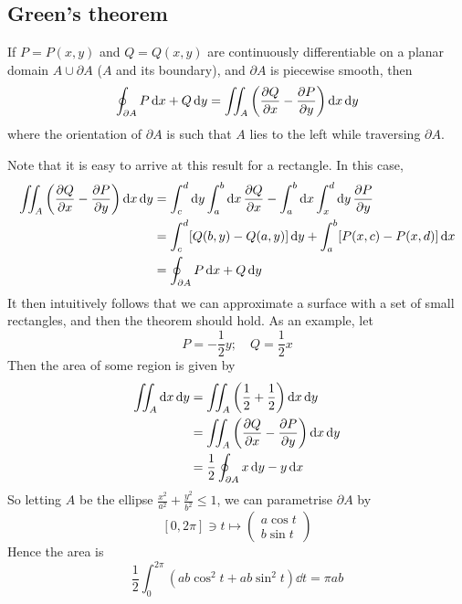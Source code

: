 \subsection{Green's theorem}
\begin{proposition}
	If \(P = P(x, y)\) and \(Q = Q(x, y)\) are continuously differentiable on a planar domain \(A \cup \partial A\) (\(A\) and its boundary), and \(\partial A\) is piecewise smooth, then
	\[
		\oint_{\partial A} P \dd{x} + Q \dd{y} = \iint_{A} \left( \pdv{Q}{x} - \pdv{P}{y} \right) \dd{x}\dd{y}
	\]
	where the orientation of \(\partial A\) is such that \(A\) lies to the left while traversing \(\partial A\).
\end{proposition}
\noindent Note that it is easy to arrive at this result for a rectangle.
In this case,
\begin{align*}
	\iint_{A} \left( \pdv{Q}{x} - \pdv{P}{y} \right) \dd{x}\dd{y} & = \int_c^d \dd{y} \int_a^b \dd{x} \pdv{Q}{x} - \int_a^b \dd{x} \int_x^d \dd{y} \pdv{P}{y} \\
	                                                              & = \int_c^d [Q(b, y) - Q(a, y)] \dd{y} + \int_a^b [P(x, c) - P(x, d)] \dd{x}               \\
	                                                              & = \oint_{\partial A} P \dd{x} + Q \dd{y}
\end{align*}
It then intuitively follows that we can approximate a surface with a set of small rectangles, and then the theorem should hold.
As an example, let
\[
	P = -\frac{1}{2}y;\quad Q = \frac{1}{2}x
\]
Then the area of some region is given by
\begin{align*}
	\iint_A \dd{x}\dd{y} & = \iint_A \left( \frac{1}{2} + \frac{1}{2} \right) \dd{x}\dd{y} \\
	                     & = \iint_A \left( \pdv{Q}{x} - \pdv{P}{y} \right) \dd{x}\dd{y}   \\
	                     & = \frac{1}{2}\oint_{\partial A} x\dd{y} - y\dd{x}
\end{align*}
So letting \(A\) be the ellipse \(\frac{x^2}{a^2} + \frac{y^2}{b^2} \leq 1\), we can parametrise \(\partial A\) by
\[
	[0, 2 \pi] \ni t \mapsto \begin{pmatrix}
		a \cos t \\ b \sin t
	\end{pmatrix}
\]
Hence the area is
\[
	\frac{1}{2}\int_0^{2\pi} \left( ab\cos^2 t + ab\sin^2 t \right) \dd{t} = \pi ab
\]

